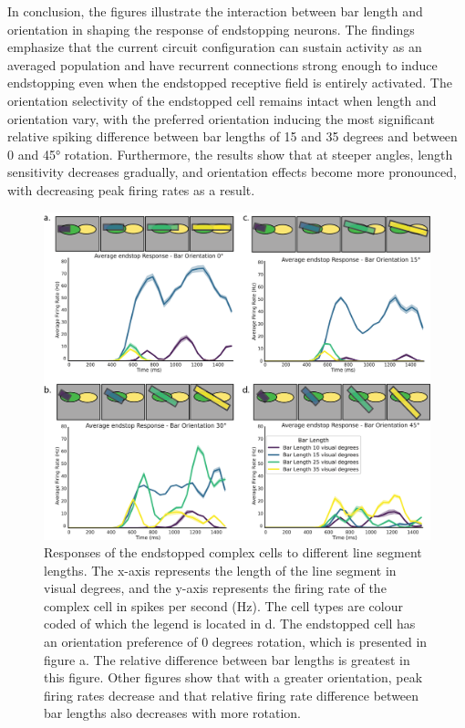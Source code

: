 \documentclass[12pt]{article}
\begin{document}
\bigbreak
In conclusion, the figures illustrate the interaction between bar length and orientation in shaping the response of endstopping neurons. The findings emphasize that the current circuit configuration can sustain activity as an averaged population and have recurrent connections strong enough to induce endstopping even when the endstopped receptive field is entirely activated. The orientation selectivity of the endstopped cell remains intact when length and orientation vary, with the preferred orientation inducing the most significant relative spiking difference between bar lengths of 15 and 35 degrees and between 0 and 45° rotation. Furthermore, the results show that at steeper angles, length sensitivity decreases gradually, and orientation effects become more pronounced, with decreasing peak firing rates as a result.

\begin{figure}[H]
    \centering
    \includegraphics[width=1 \textwidth]{./figures/LIF_endstopping_length_orientation.png}
    \caption{Responses of the endstopped complex cells to different line segment lengths. The x-axis represents the length of the line segment in visual degrees, and the y-axis represents the firing rate of the complex cell in spikes per second (Hz). The cell types are colour coded of which the legend is located in d. The endstopped cell has an orientation preference of 0 degrees rotation, which is presented in figure a. The relative difference between bar lengths is greatest in this figure. Other figures show that with a greater orientation, peak firing rates decrease and that relative firing rate difference between bar lengths also decreases with more rotation.}
    \label{fig:endstopping}
\end{figure}
\end{document}
